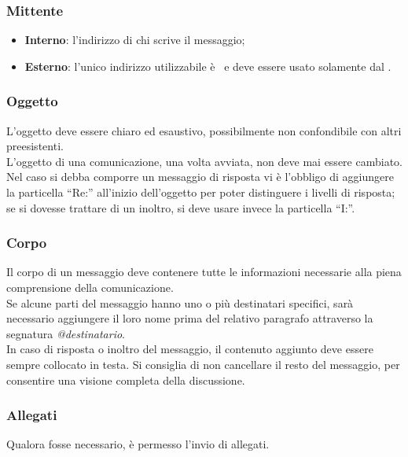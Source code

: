 \documentclass[../NormeDiProgetto.tex]{subfiles}
\begin{document}
				\subsubsection{Mittente}
					\begin{itemize}
						\item \textbf{Interno}: l'indirizzo di chi scrive
						il messaggio;
						\item \textbf{Esterno}: l'unico indirizzo utilizzabile è
						\mailkaleidoscode\ e deve essere usato solamente dal
						\responsabilediprogetto.
					\end{itemize}
				\subsubsection{Oggetto}
					L'oggetto deve essere chiaro ed esaustivo, possibilmente non
					confondibile con altri preesistenti.\\
					L'oggetto di una comunicazione, una volta avviata, non deve mai essere cambiato.\\
					Nel caso si debba comporre un messaggio di risposta vi è l'obbligo di aggiungere la
					particella ``Re:'' all'inizio dell'oggetto per poter distinguere i
					livelli di risposta; se si dovesse trattare di un inoltro, si deve
					usare invece la particella ``I:''.
				\subsubsection{Corpo}
					Il corpo di un messaggio deve contenere tutte le informazioni
					necessarie alla piena comprensione della comunicazione.\\
					Se alcune parti del messaggio hanno uno o più destinatari specifici,
					sarà necessario aggiungere il loro nome	prima del relativo paragrafo
					attraverso la segnatura	\textit{@destinatario}.\\
					In caso di risposta o inoltro del messaggio, il contenuto aggiunto deve
					essere sempre collocato in testa.
					Si consiglia di non cancellare il resto del messaggio,
					per consentire una visione completa della discussione.
				\subsubsection{Allegati}
					Qualora fosse necessario, è permesso l'invio di allegati.
\end{document}
